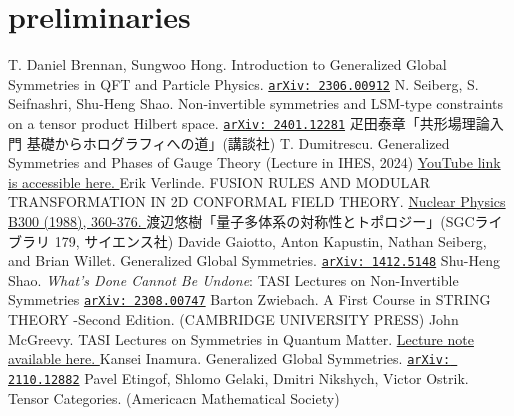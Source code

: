\documentclass{ltjsarticle}
\theoremstyle{mystyle} %
\numberwithin{equation}{section}
\begin{document}
\section{preliminaries}

\begin{thebibliography}{99}
     T. Daniel Brennan, Sungwoo Hong. 
    Introduction to Generalized Global Symmetries in QFT and Particle Physics. \href{https://arxiv.org/abs/2306.00912}{\texttt{arXiv: 2306.00912}}
     N. Seiberg, S. Seifnashri, Shu-Heng Shao. 
    Non-invertible symmetries and LSM-type constraints on a tensor product Hilbert space. 
    \href{https://arxiv.org/pdf/2401.12281}{\texttt{arXiv: 2401.12281}}
     疋田泰章「共形場理論入門 基礎からホログラフィへの道」(講談社)
     T. Dumitrescu. Generalized Symmetries and Phases of Gauge Theory 
    (Lecture in IHES, 2024) \href{https://www.youtube.com/watch?v=9pqtqyGtt3M&t=3760s}{YouTube link is accessible here. }
     Erik Verlinde. 
    FUSION RULES AND MODULAR TRANSFORMATION IN 2D CONFORMAL FIELD THEORY. 
    \href{https://tianyuan.scu.edu.cn/upload/default/20220602/Verlinde_Fusion_rules_and_modular_transformations%20in%202D%20CFT.pdf}{Nuclear Physics B300 (1988), 360-376. }
     渡辺悠樹「量子多体系の対称性とトポロジー」(SGCライブラリ 179, サイエンス社)
     Davide Gaiotto, Anton Kapustin, Nathan Seiberg, and Brian Willet. 
    Generalized Global Symmetries. 
    \href{https://arxiv.org/pdf/1412.5148}{\texttt{arXiv: 1412.5148}}
     Shu-Heng Shao. 
    \textit{What's Done Cannot Be Undone}: TASI Lectures on Non-Invertible Symmetries
    \href{https://arxiv.org/pdf/2308.00747}{\texttt{arXiv: 2308.00747}}
     Barton Zwiebach. 
    A First Course in STRING THEORY -Second Edition. (CAMBRIDGE UNIVERSITY PRESS)
    John McGreevy. TASI Lectures on Symmetries in Quantum Matter. 
    \href{https://mcgreevy.physics.ucsd.edu/talks/2023-TASI-lectures.pdf}{Lecture note available here. }
     Kansei Inamura. 
    Generalized Global Symmetries. 
    \href{https://arxiv.org/pdf/2110.12882}{\texttt{arXiv: 2110.12882}}
     Pavel Etingof, Shlomo Gelaki, Dmitri Nikshych, Victor Ostrik. 
    Tensor Categories. (Americacn Mathematical Society)
\end{thebibliography}
\end{document}

